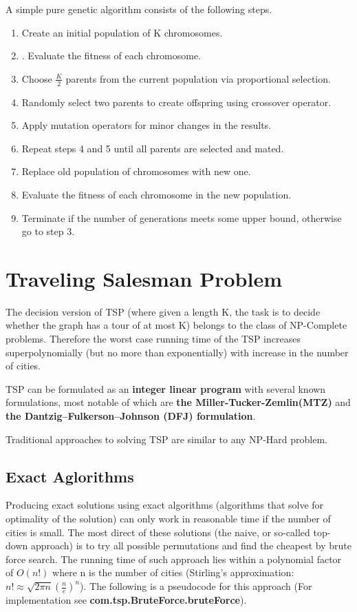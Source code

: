 \documentclass[11pt]{article}
\begin{document}
A simple pure genetic algorithm consists of the following steps.
\indent
\begin{enumerate}
\item Create an initial population of K chromosomes.
\item. Evaluate the fitness of each chromosome.
\item Choose $\frac{K}{2} $ parents from the current population via proportional selection.
\item Randomly select two parents to create offspring using crossover operator.
\item Apply mutation operators for minor changes in the results.
\item Repeat steps 4 and 5 until all parents are selected and mated.
\item Replace old population of chromosomes with new one.
\item Evaluate the fitness of each chromosome in the new population.
\item Terminate if the number of generations meets some upper bound, otherwise go to step 3.
\end{enumerate}

\section{Traveling Salesman Problem}
The decision version of TSP (where given a length K, the task is to decide whether the graph has a tour of at most K) belongs to the class of NP-Complete problems. Therefore the worst case running time of the TSP increases superpolynomially (but no more than exponentially) with increase in the number of cities.  \par

TSP can be formulated as an \textbf{integer linear program}\cite{ilp1, ilp2, ilp3} with several known formulations, most notable of which are \textbf{the Miller-Tucker-Zemlin(MTZ)} and \textbf{the Dantzig–Fulkerson–Johnson (DFJ) formulation}. \par
Traditional approaches to solving TSP are similar to any NP-Hard problem.


\subsection{Exact Aglorithms} Producing exact solutions using exact algorithms (algorithms that solve for optimality of the solution) can only work in reasonable time if the number of cities is small. The most direct of these solutions (the naive, or so-called top-down approach) is to try all possible permutations and find the cheapest by brute force search. The running time of such approach lies within a polynomial factor of $O(n!)$ where n is the number of cities (Stirling's approximation: $n! \approx \sqrt{2 \pi n} (\frac{n}{e})^n$). The following is a pseudocode for this approach (For implementation see \textbf{com.tsp.BruteForce.bruteForce}).
 
\end{document}
